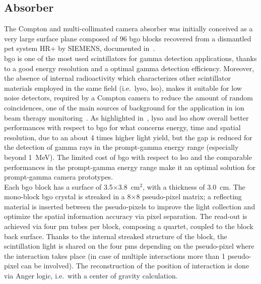 
\subsection{Absorber}\label{chap3::subsec::absorber}

The Compton and multi-collimated camera absorber was initially conceived as a very large surface plane composed of 96 \gls{bgo} blocks recovered from a dismantled \gls{pet} system HR+ by SIEMENS, documented in~\parencite{Adam1997, Brix1997}.\\ 
\gls{bgo} is one of the most used scintillators for gamma detection applications, thanks to a good energy resolution and a optimal gamma detection efficiency. Moreover, the absence of internal radioactivity which characterizes other scintillator materials employed in the same field (i.e.~\gls{lyso}, \gls{lso}), makes it suitable for low noise detectors, required by a Compton camera to reduce the amount of random coincidences, one of the main sources of background for the application in ion beam therapy monitoring~\parencite{Ortega2015}. As highlighted in~\parencite{HuesoGonzalez2015}, \gls{lyso} and \gls{lso} show overall better performances with respect to \gls{bgo} for what concerns energy, time and spatial resolution, due to an about 4 times higher light yield, but the gap is reduced for the detection of gamma rays in the prompt-gamma energy range (especially beyond 1~MeV). The limited cost of \gls{bgo} with respect to \gls{lso} and the comparable performances in the prompt-gamma energy range make it an optimal solution for prompt-gamma camera prototypes.\\
Each \gls{bgo} block has a surface of 3.5$\times$3.8~cm$^2$, with a thickness of 3.0~cm. The mono-block \gls{bgo} crystal is streaked in a 8$\times$8 pseudo-pixel matrix; a reflecting material is inserted between the pseudo-pixels to improve the light collection and optimize the spatial information accuracy via pixel separation. The read-out is achieved via four \gls{pm} tubes per block, composing a quartet, coupled to the block back surface. Thanks to the internal streaked structure of the block, the scintillation light is shared on the four \glspl{pm} depending on the pseudo-pixel where the interaction takes place (in case of multiple interactions more than 1 pseudo-pixel can be involved). The reconstruction of the position of interaction is done via Anger logic, i.e.~with a center of gravity calculation.\\
